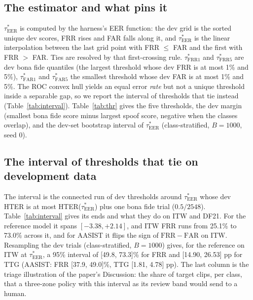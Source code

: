 \documentclass[10pt]{article}
\newcommand{\frr}{\mathrm{FRR}}
\newcommand{\far}{\mathrm{FAR}}
\newcommand{\tauE}{\tau^{*}_{\mathrm{EER}}}
\newcommand{\tauF}[1]{\tau^{*}_{\mathrm{FRR}#1}}
\newcommand{\tauA}[1]{\tau^{*}_{\mathrm{FAR}#1}}
\newcommand{\wide}[1]{\begingroup\footnotesize\setlength{\tabcolsep}{3.5pt}\resizebox{\textwidth}{!}{}\endgroup}
\begin{document}
\subsection{The estimator and what pins it}
\(\tauE\) is computed by the harness's EER function: the dev grid is the sorted unique dev scores, FRR rises and FAR falls along it, and
\(\tauE\) is the linear interpolation between the last grid point with FRR \(\le\) FAR and the first with FRR \(>\) FAR. Ties are resolved
by that first-crossing rule. \(\tauF{1}\) and \(\tauF{5}\) are dev bona fide quantiles (the largest threshold whose dev FRR is at most 1\%
and 5\%), \(\tauA{1}\) and \(\tauA{5}\) the smallest threshold whose dev FAR is at most 1\% and 5\%. The ROC convex hull yields an equal
error \emph{rate} but not a unique threshold inside a separable gap, so we report the interval of thresholds that tie instead
(Table~\ref{tab:interval}). Table~\ref{tab:thr} gives the five thresholds, the dev margin (smallest bona fide score minus largest spoof score, negative when the classes overlap), and the dev-set bootstrap interval of \(\tauE\) (class-stratified, \(B=1000\), seed 0).

\begin{table}[!ht]
\caption{Development thresholds, margins and the dev-bootstrap interval of \(\tauE\).}
\label{tab:thr}
\centering
\wide{s_tab_thresholds}
\end{table}

\subsection{The interval of thresholds that tie on development data}
The interval is the connected run of dev thresholds around \(\tauE\) whose dev HTER is at most HTER(\(\tauE\)) plus one bona fide trial
(\(0.5/2548\)). Table~\ref{tab:interval} gives its ends and what they do on ITW and DF21. For the reference model it spans
\([-3.38,+2.14]\), and ITW FRR runs from 25.1\% to 73.0\% across it, and for AASIST it flips the sign of \(\frr-\far\) on ITW.
Resampling the dev trials (class-stratified, \(B=1000\)) gives, for the reference on ITW at \(\tauE\), a 95\% interval of
[49.8, 73.3]\% for FRR and [14.90, 26.53] pp for TTG (AASIST: FRR [37.9, 49.0]\%, TTG [1.81, 4.78] pp). The last column is the triage
illustration of the paper's Discussion: the share of target clips, per class, that a three-zone policy with this interval as its review band
would send to a human.

\begin{table}[!ht]
\caption{Ends of the dev-equivalent interval of \(\tauE\), FRR/FAR on ITW and DF21 at the ends and at the registered threshold, and the share
of ITW clips (genuine/spoof) inside the interval.}
\label{tab:interval}
\centering
\wide{s_tab_interval}
\end{table}
\end{document}
